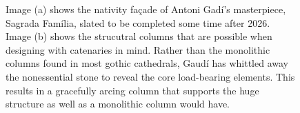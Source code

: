 \documentclass{thesis}
\begin{document}
\begin{figure}
\centering
{}
\caption[Sagrada Fam\'{i}lia, Barcelona, Spain]{Image (a) shows the nativity fa\c{c}ade of Antoni Gad\'{i}'s masterpiece, Sagrada Fam\'{i}lia,
slated to be completed some time after 2026.  Image (b) shows the strucutral columns that are possible when
designing with catenaries in mind.  Rather than the monolithic columns found in most gothic cathedrals, Gaud\'{i} has whittled away the nonessential
stone to reveal the core load-bearing elements.  This results in a gracefully arcing column that supports the huge structure as well as a monolithic
column would have.\footnotemark}
\label{fig:sagrada_familia}
\end{figure}
\end{document}
